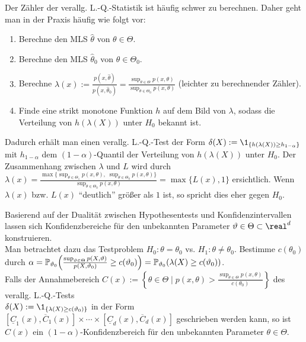 \begin{Bem}
    Der Zähler der verallg. L.-Q.-Statistik ist häufig schwer zu berechnen.
    Daher geht man in der Praxis häufig wie folgt vor:
    \begin{enumerate}[label=\arabic*.]
        \item
        Berechne den MLS $\widehat{\theta}$ von $\theta \in \Theta$.

        \item
        Berechne den MLS $\widehat{\theta}_0$ von $\theta \in \Theta_0$.

        \item
        Berechne $\lambda(x) := \frac{p(x, \widehat{\theta})}{p(x, \widehat{\theta}_0)}
        = \frac{\sup_{\theta \in \Theta} p(x, \theta)}{\sup_{\theta \in \Theta_0} p(x, \theta)}$
        (leichter zu berechnender Zähler).

        \item
        Finde eine strikt monotone Funktion $h$ auf dem Bild von $\lambda$,
        sodass die Verteilung von $h(\lambda(X))$ unter $H_0$ bekannt ist.
    \end{enumerate}
    Dadurch erhält man einen verallg. L.-Q.-Test der Form
    $\delta(X) := \1_{\{h(\lambda(X)) \ge h_{1-\alpha}\}}$
    mit $h_{1-\alpha}$ dem $(1-\alpha)$-Quantil der Verteilung von $h(\lambda(X))$ unter $H_0$.
    Der Zusammenhang zwischen $\lambda$ und $L$ wird durch
    $\lambda(x) = \frac{\max\{\sup_{\theta \in \Theta_1} p(x, \theta),\;
    \sup_{\theta \in \Theta_0} p(x, \theta)\}}{\sup_{\theta \in \Theta_0} p(x, \theta)}
    = \max\{L(x), 1\}$ ersichtlich.
    Wenn $\lambda(x)$ bzw. $L(x)$ "`deutlich"' größer als $1$ ist, so spricht dies eher
    gegen $H_0$.
\end{Bem}

\linie
\pagebreak

\begin{Bem}
    Basierend auf der Dualität zwischen Hypothesentests und Konfidenzintervallen lassen sich
    Konfidenzbereiche für den unbekannten Parameter $\theta \in \Theta \subset \real^d$
    konstruieren.\\
    Man betrachtet dazu das Testproblem $H_0\colon \theta = \theta_0$ vs.
    $H_1\colon \theta \not= \theta_0$.
    Bestimme $c(\theta_0)$ durch $\alpha =
    \mathbb{P}_{\vartheta_0}\!\left(\frac{\sup_{\vartheta \in \Theta}
    p(X, \vartheta)}{p(X, \vartheta_0)} \ge c(\vartheta_0)\right)
    = \mathbb{P}_{\vartheta_0}(\lambda(X) \ge c(\vartheta_0))$.\\
    Falls der Annahmebereich
    $C(x) := \left\{\theta \in \Theta \;|\;
    p(x, \theta) > \frac{\sup_{\theta \in \Theta} p(x, \theta)}{c(\theta_0)}\right\}$
    des verallg. L.-Q.-Tests\\
    $\delta(X) := \1_{\{\lambda(X) \ge c(\theta_0)\}}$
    in der Form
    $[\underline{C}_1(x), \overline{C}_1(x)] \times \dotsb \times
    [\underline{C}_d(x), \overline{C}_d(x)]$ geschrieben werden kann,
    so ist $C(x)$ ein $(1-\alpha)$-Konfidenzbereich für den unbekannten Parameter
    $\theta \in \Theta$.
\end{Bem}

